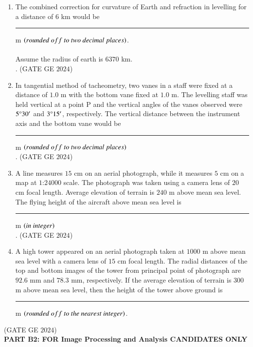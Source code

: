 \documentclass[journal,12pt,onecolumn]{IEEEtran}
\theoremstyle{remark}
\begin{document}
\begin{enumerate}
\item The combined correction for curvature of Earth and refraction in levelling for a distance of $6$ km would be \rule{2cm}{0.5mm} m $\brak{rounded\ off\ to\ two\ decimal\ places}$.\\
\\Assume the radius of earth is $6370$ km.\\.
\hfill{(GATE GE $2024$)}
\bigskip
\item In tangential method of tacheometry, two vanes in a staff were fixed at a distance of $1.0$ m with the bottom vane fixed at $1.0$ m.
The levelling staff was held vertical at a point P and the vertical angles of the vanes observed were $5\degree30'$ and $3\degree15'$, respectively.
The vertical distance between the instrument axis and the bottom vane would be \rule{2cm}{0.5mm} m $\brak{rounded\ off\ to\ two\ decimal\ places}$\\.
\hfill{(GATE GE $2024$)}
\bigskip
\item A line measures $15$ cm on an aerial photograph, while it measures $5$ cm on a map at $1$:$24000$ scale.
The photograph was taken using a camera lens of $20$ cm focal length.
Average elevation of terrain is $240$ m above mean sea level.
The flying height of the aircraft above mean sea level is \rule{2cm}{0.5mm} m $\left(in\ integer\right)$\\.
\hfill{(GATE GE $2024$)}
\bigskip
\item A high tower appeared on an aerial photograph taken at $1000$ m above mean sea level with a camera lens of $15$ cm focal length.
The radial distances of the top and bottom images of the tower from principal point of photograph are $92.6$ mm and $78.3$ mm, respectively.
If the average elevation of terrain is $300$ m above mean sea level, then the height of the tower above ground is \rule{2cm}{0.5mm} m $\brak{rounded\ off\ to\ the\ nearest\ integer}$.
\end{enumerate}
\hfill{(GATE GE $2024$)}
\bigskip
\\
\textbf{PART B2: FOR Image Processing and Analysis CANDIDATES ONLY}\\
\\
\end{document}
